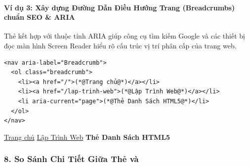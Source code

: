 \paragraph{Ví dụ 3: Xây dựng Đường Dẫn Điều Hướng Trang (Breadcrumbs) chuẩn SEO \& ARIA}
Thẻ  kết hợp với thuộc tính ARIA giúp công cụ tìm kiếm Google và các thiết bị đọc màn hình Screen Reader hiểu rõ cấu trúc vị trí phân cấp của trang web.

\begin{codeWindow}
\begin{lstlisting}[language=HTML5]
<nav aria-label="Breadcrumb">
  <ol class="breadcrumb">
    <li><a href="/">(*@Trang chủ@*)</a></li>
    <li><a href="/lap-trinh-web">(*@Lập Trình Web@*)</a></li>
    <li aria-current="page">(*@Thẻ Danh Sách HTML5@*)</li>
  </ol>
</nav>
\end{lstlisting}
\end{codeWindow}

\begin{browserWindow}
\begin{tcolorbox}[
    enhanced,
    colback=noteBg!50,
    colframe=noteBorder!25,
    boxrule=0.6pt,
    arc=5pt,
    top=6pt, bottom=6pt, left=10pt, right=10pt
]
\sffamily\small
\textcolor{primaryBlue}{\underline{Trang chủ}} \quad{\color{codeComment}/}\quad
\textcolor{primaryBlue}{\underline{Lập Trình Web}} \quad{\color{codeComment}/}\quad
\textcolor{darkText}{\textbf{Thẻ Danh Sách HTML5}}
\end{tcolorbox}
\end{browserWindow}

\subsubsection{8. So Sánh Chi Tiết Giữa Thẻ  và }

